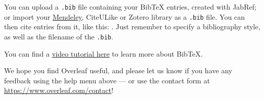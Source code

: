 You can upload a \verb|.bib| file containing your BibTeX entries, created with JabRef; or import your \href{https://www.overleaf.com/blog/184}{Mendeley}, CiteULike or Zotero library as a \verb|.bib| file. You can then cite entries from it, like this: \cite{greenwade93}. Just remember to specify a bibliography style, as well as the filename of the \verb|.bib|.

You can find a \href{https://www.overleaf.com/help/97-how-to-include-a-bibliography-using-bibtex}{video tutorial here} to learn more about BibTeX.

We hope you find Overleaf useful, and please let us know if you have any feedback using the help menu above --- or use the contact form at \url{https://www.overleaf.com/contact}!
